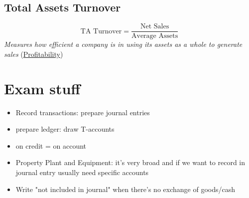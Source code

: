 \documentclass{article}
\begin{document}
\begin{multicols}{2}
\subsection{Total Assets Turnover}
$$\text{TA Turnover} = \frac{\text{Net Sales}}{\text{Average Assets}}$$
\textit{Measures how efficient a company is in using its assets as a whole to generate sales} (\underline{Profitability})

\section{Exam stuff}
\begin{itemize}
	\item Record transactions: prepare journal entries
	\item prepare ledger: draw T-accounts
	\item on credit = on account
	\item Property Plant and Equipment: it's very broad and if we want to record in journal entry usually need specific accounts
	\item Write "not included in journal" when there's no exchange of goods/cash
\end{itemize}
\end{multicols}
\end{document}
